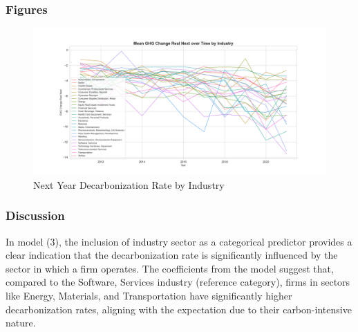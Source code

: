 


\subsubsection{Figures}

\begin{figure}[H]
\centering
  \includegraphics[width=\textwidth]{figures/ghg_change_real_next_over_time_by_industry.png}
\caption{Next Year Decarbonization Rate by Industry}
\label{fig:industry_vs_ghg_change_real_next}
\end{figure}

\subsubsection{Discussion}
In model (3), the inclusion of industry sector as a categorical predictor provides a clear indication that the decarbonization rate is significantly influenced by the sector in which a firm operates. The coefficients from the model suggest that, compared to the Software, Services industry (reference category), firms in sectors like Energy, Materials, and Transportation have significantly higher decarbonization rates, aligning with the expectation due to their carbon-intensive nature.


